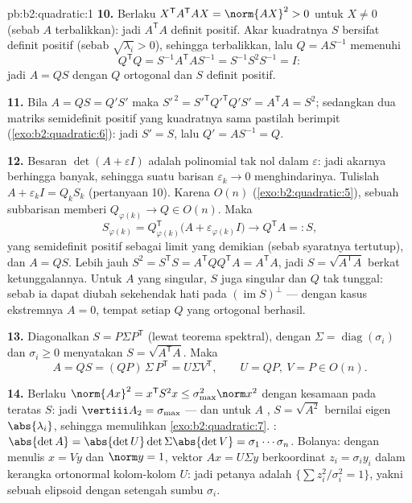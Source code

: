 \begin{solution}{pb:b2:quadratic:1}
\textbf{10.} Berlaku $X^{\mathsf T}A^{\mathsf T}AX = \norm{AX}^2 > 0$
untuk $X \neq 0$ (sebab $A$ terbalikkan): jadi $A^{\mathsf T}A$ definit
positif. Akar kuadratnya $S$ bersifat definit positif (sebab 
$\sqrt{\lambda_i} > 0$), sehingga terbalikkan, lalu $Q = AS^{-1}$
memenuhi
\[
Q^{\mathsf T}Q = S^{-1}A^{\mathsf T}AS^{-1}
= S^{-1}S^2S^{-1} = I :
\]
jadi $A = QS$ dengan $Q$ ortogonal dan $S$ definit positif.

\textbf{11.} Bila $A = QS = Q'S'$ maka $S'^{\,2} =
S'^{\mathsf T}Q'^{\mathsf T}Q'S' = A^{\mathsf T}A = S^2$; sedangkan dua
matriks semidefinit positif yang kuadratnya sama pastilah berimpit
(\cref{exo:b2:quadratic:6}): jadi $S' = S$, lalu $Q' = AS^{-1} =
Q$.

\textbf{12.} Besaran $\det(A + \varepsilon I)$ adalah polinomial tak nol
dalam $\varepsilon$: jadi akarnya berhingga banyak, sehingga suatu barisan
$\varepsilon_k \to 0$ menghindarinya. Tulislah $A + \varepsilon_kI =
Q_kS_k$ (pertanyaan 10). Karena $O(n)$ 
(\cref{exo:b2:quadratic:5}), sebuah subbarisan memberi $Q_{\varphi(k)}
\to Q \in O(n)$. Maka
\[
S_{\varphi(k)} = Q_{\varphi(k)}^{\mathsf T}
\bigl(A + \varepsilon_{\varphi(k)}I\bigr)
\longrightarrow Q^{\mathsf T}A =: S,
\]
yang  semidefinit positif sebagai limit yang demikian (sebab
syaratnya tertutup), dan $A = QS$. Lebih jauh $S^2 = S^{\mathsf T}S =
A^{\mathsf T}QQ^{\mathsf T}A = A^{\mathsf T}A$, jadi $S =
\sqrt{A^{\mathsf T}A}$ berkat ketunggalannya. Untuk $A$ yang singular, $S$
juga singular dan $Q$ tak tunggal: sebab ia dapat diubah sekehendak hati
pada $(\operatorname{im} S)^{\perp}$ --- dengan kasus ekstremnya $A = 0$,
tempat setiap $Q$ yang ortogonal berhasil.

\textbf{13.} Diagonalkan $S = P\Sigma P^{\mathsf T}$ (lewat teorema
spektral), dengan $\Sigma = \operatorname{diag}(\sigma_i)$ dan
$\sigma_i \geq 0$ menyatakan  $S =
\sqrt{A^{\mathsf T}A}$. Maka
\[
A = QS = (QP)\,\Sigma\,P^{\mathsf T} = U\Sigma V^{\mathsf T},
\qquad U = QP,\ V = P \in O(n) .
\]

\textbf{14.} Berlaku $\norm{Ax}^2 = x^{\mathsf T}S^2x \leq
\sigma_{\max}^2\norm x^2$ dengan kesamaan pada  teratas
$S$: jadi $\vertiii A_2 = \sigma_{\max}$ --- dan untuk $A$ ,
$S = \sqrt{A^2}$ bernilai eigen $\abs{\lambda_i}$, sehingga memulihkan
\cref{exo:b2:quadratic:7}. : $\abs{\det A} =
\abs{\det U}\det\Sigma\abs{\det V} = \sigma_1\cdots\sigma_n$.
Bolanya: dengan menulis $x = Vy$ dan $\norm y = 1$, vektor $Ax = U\Sigma y$
berkoordinat $z_i = \sigma_iy_i$ dalam kerangka ortonormal
kolom-kolom $U$: jadi petanya adalah $\{\sum z_i^2/\sigma_i^2 =
1\}$, yakni sebuah elipsoid dengan setengah sumbu $\sigma_i$.


\end{solution}
